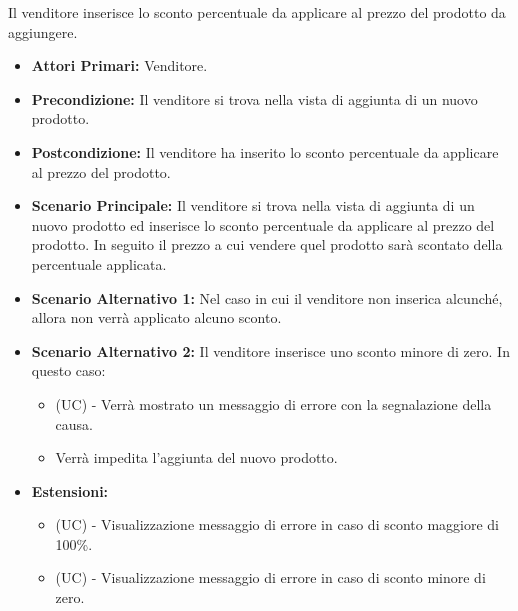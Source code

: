 Il venditore inserisce lo sconto percentuale da applicare al prezzo del prodotto da aggiungere.
\begin{itemize}
    \item \textbf{Attori Primari:} Venditore.
    \item \textbf{Precondizione:} Il venditore si trova nella vista di aggiunta di un nuovo prodotto.
    \item \textbf{Postcondizione:} Il venditore ha inserito lo sconto percentuale da applicare al prezzo del prodotto.
    \item \textbf{Scenario Principale:} Il venditore si trova nella vista di aggiunta di un nuovo prodotto ed inserisce lo sconto percentuale da applicare al prezzo del prodotto. In seguito il prezzo a cui vendere quel prodotto sarà scontato della percentuale applicata.
    \item \textbf{Scenario Alternativo 1:} Nel caso in cui il venditore non inserica alcunché, allora non verrà applicato alcuno sconto. 
    \item \textbf{Scenario Alternativo 2:} Il venditore inserisce uno sconto minore di zero. In questo caso:
    \begin{itemize}
        \item (UC) - Verrà mostrato un messaggio di errore con la segnalazione della causa.
        \item Verrà impedita l'aggiunta del nuovo prodotto.
    \end{itemize}
    \item \textbf{Estensioni:}
    \begin{itemize}
        \item (UC) - Visualizzazione messaggio di errore in caso di sconto maggiore di 100\%.
        \item (UC) - Visualizzazione messaggio di errore in caso di sconto minore di zero.
    \end{itemize}
\end{itemize}


